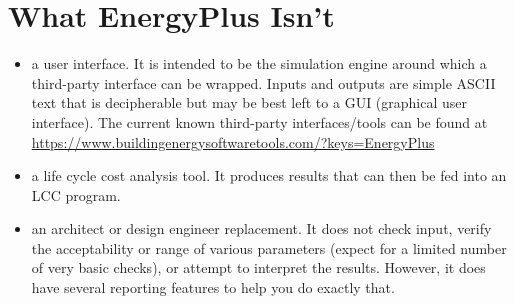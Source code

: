 \section{What EnergyPlus Isn't}\label{what-energyplus-isnt}

\begin{itemize}
\tightlist
\item
    a user interface. It is intended to be the simulation engine around which a third-party interface can be wrapped. Inputs and outputs are simple ASCII text that is decipherable but may be best left to a GUI (graphical user interface). The current known third-party interfaces/tools can be found at \url{https://www.buildingenergysoftwaretools.com/?keys=EnergyPlus}
\item
  a life cycle cost analysis tool. It produces results that can then be fed into an LCC program.
\item
  an architect or design engineer replacement. It does not check input, verify the acceptability or range of various parameters (expect for a limited number of very basic checks), or attempt to interpret the results. However, it does have several reporting features to help you do exactly that.
\end{itemize}
